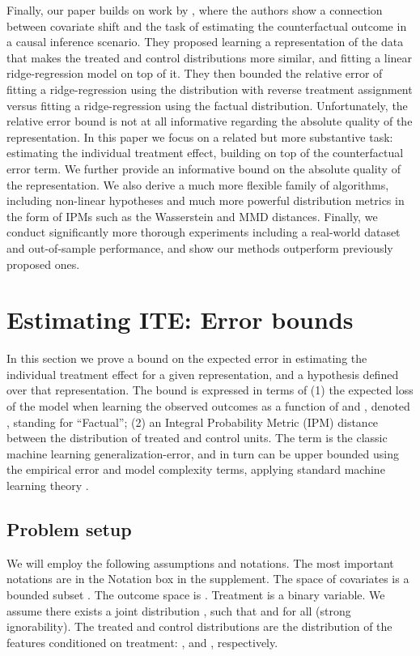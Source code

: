 \documentclass{article}
\begin{document}
Finally, our paper builds on work by \citet{johansson2016counterfactual}, where the authors show a connection between covariate shift and the task of estimating the counterfactual outcome in a causal inference scenario. They proposed learning a representation of the data that makes the treated and control distributions more similar, and fitting a linear ridge-regression model on top of it. They then bounded the relative error of fitting a ridge-regression using the distribution with reverse treatment  assignment versus fitting a ridge-regression using the factual distribution. Unfortunately, the relative error bound is not at all informative regarding the absolute quality of the representation. In this paper we focus on a related but more substantive task: estimating the individual treatment effect, building on top of the counterfactual error term. We further provide an informative bound on the absolute quality of the representation. We also derive a much more flexible family of algorithms, including non-linear hypotheses and much more powerful distribution metrics in the form of IPMs such as the Wasserstein and MMD distances. Finally, we conduct significantly more thorough experiments including a real-world dataset and out-of-sample performance, and show our methods outperform previously proposed ones.
 
\section{Estimating ITE: Error bounds}\label{sec:theory}

In this section we prove a bound on the expected error in estimating the individual treatment effect for a given representation, and a hypothesis defined over that representation.
The bound is expressed in terms of (1) the expected loss of the model when learning the observed outcomes  as a function of  and , denoted ,  standing for ``Factual''; (2) an Integral Probability Metric (IPM) distance between the distribution of treated and control units. The term  is the classic machine learning generalization-error, and in turn can be upper bounded using the empirical error and model complexity terms, applying standard machine learning theory \citep{shalev2014understanding}.

\subsection{Problem setup}
We will employ the following assumptions and notations. The most important notations are in the Notation box in the supplement.
The space of covariates is a bounded subset . The outcome space is . Treatment  is a binary variable. We assume there exists a joint distribution , such that  and  for all  (strong ignorability).
The treated and control distributions are the distribution of the features  conditioned on treatment: , and , respectively.
\end{document}
